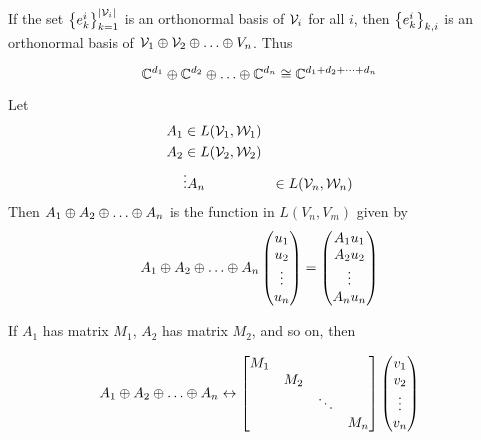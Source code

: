 If the set $\left\lbrace e_k^i\right\rbrace_{k=1}^{\left\lvert\mathcal{V}_i\right\rvert}$ is an orthonormal basis
of $\mathcal{V}_i$ for all $i$, then $\left\lbrace e_k^i\right\rbrace_{k,i}$ is an orthonormal basis
of $\vecspace{V}_1 \directsum \vecspace{V}_2 \directsum \dots \directsum{V}_n$. Thus

\[\complexnums^{d_1} \directsum \complexnums^{d_2} \directsum \dots \directsum \complexnums^{d_n} \isomorphic \complexnums^{d_1 + d_2 + \dots + d_n}\]

\begin{definition}
    Let
    \begin{align*}
        A_1 & \in L(\mathcal{V}_1, \mathcal{W}_1) \\
        A_2 & \in L(\mathcal{V}_2, \mathcal{W}_2) \\
            & \vdots
        A_n & \in L(\mathcal{V}_n, \mathcal{W}_n)
    \end{align*}
    Then $A_1 \directsum A_2 \directsum \dots \directsum A_n$ is the function in $L(V_n, V_m)$ given
    by
    \[A_1 \directsum A_2 \directsum \dots \directsum A_n\begin{pmatrix}u_1\\u_2\\\vdots\\u_n\end{pmatrix} = \begin{pmatrix}A_1u_1\\A_2u_2\\\vdots\\A_nu_n\end{pmatrix}\]
\end{definition}

If $A_1$ has matrix $M_1$, $A_2$ has matrix $M_2$, and so on, then

\[A_1 \directsum A_2 \directsum \dots \directsum A_n \leftrightarrow \begin{bmatrix}M_1\\ &M_2\\ & &\ddots\\ & & & M_n\end{bmatrix}\begin{pmatrix}v_1\\v_2\\\vdots\\v_n\end{pmatrix}\]

